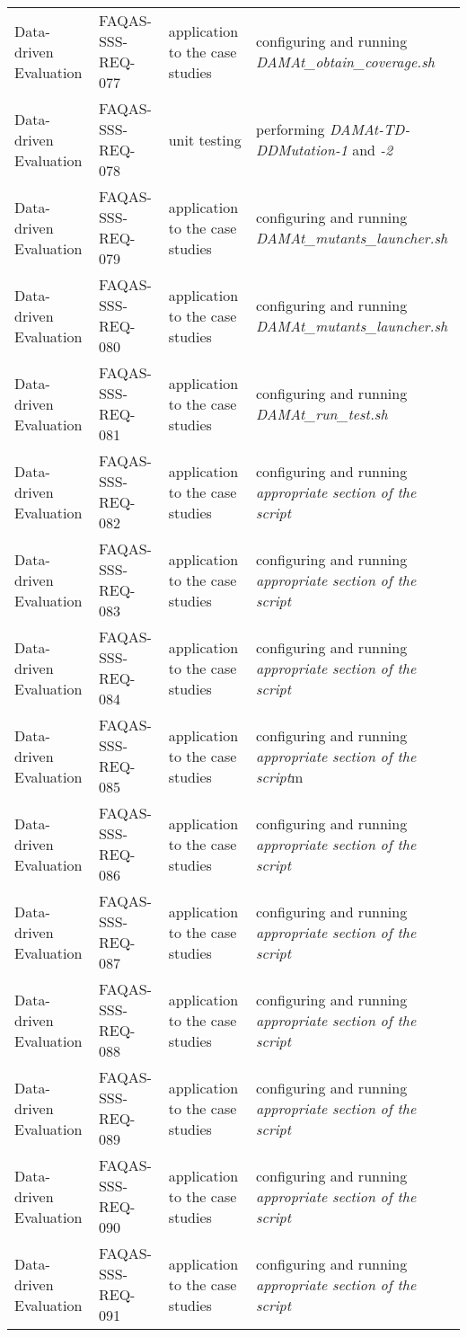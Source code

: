 \begin{table}[H]
{\begin{tabular}{|l|l|l|l|}
Data-driven Evaluation & FAQAS-SSS-REQ-077 & application to the case studies & configuring and running \emph{DAMAt\_obtain\_coverage.sh} \\
Data-driven Evaluation & FAQAS-SSS-REQ-078 & unit testing &  performing \emph{DAMAt-TD-DDMutation-1} and \emph{-2} \\
Data-driven Evaluation & FAQAS-SSS-REQ-079 & application to the case studies & configuring and running \emph{DAMAt\_mutants\_launcher.sh}\\
Data-driven Evaluation & FAQAS-SSS-REQ-080 & application to the case studies & configuring and running \emph{DAMAt\_mutants\_launcher.sh} \\
Data-driven Evaluation & FAQAS-SSS-REQ-081 & application to the case studies & configuring and running \emph{DAMAt\_run\_test.sh}\\
Data-driven Evaluation & FAQAS-SSS-REQ-082 & application to the case studies & configuring and running \emph{appropriate section of the script} \\
Data-driven Evaluation & FAQAS-SSS-REQ-083 & application to the case studies & configuring and running \emph{appropriate section of the script} \\
Data-driven Evaluation & FAQAS-SSS-REQ-084 & application to the case studies & configuring and running \emph{appropriate section of the script} \\
Data-driven Evaluation & FAQAS-SSS-REQ-085 & application to the case studies & configuring and running \emph{appropriate section of the script}m \\
Data-driven Evaluation & FAQAS-SSS-REQ-086 & application to the case studies & configuring and running \emph{appropriate section of the script} \\
Data-driven Evaluation & FAQAS-SSS-REQ-087 & application to the case studies & configuring and running \emph{appropriate section of the script} \\
Data-driven Evaluation & FAQAS-SSS-REQ-088 & application to the case studies & configuring and running \emph{appropriate section of the script} \\
Data-driven Evaluation & FAQAS-SSS-REQ-089 & application to the case studies & configuring and running \emph{appropriate section of the script}\\
Data-driven Evaluation & FAQAS-SSS-REQ-090 & application to the case studies & configuring and running \emph{appropriate section of the script} \\
Data-driven Evaluation & FAQAS-SSS-REQ-091 & application to the case studies & configuring and running \emph{appropriate section of the script} \\

\end{tabular}}
\end{table}
